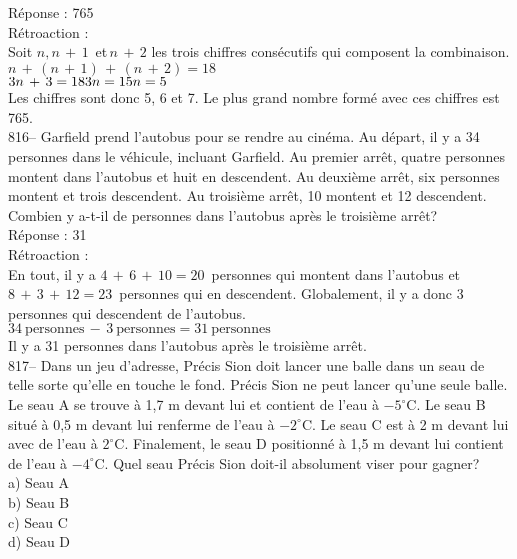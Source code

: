 ﻿\documentclass[letterpaper, 12pt]{article}
\begin{document}
R\'eponse : 765\\

R\'etroaction : \\
Soit $n, n\,+\,1\,$ et$\, n\,+\,2$ les trois chiffres cons\'ecutifs qui
composent la combinaison.  \\
$n\,+\,\left( n\,+\,1\right) \,+\,\left( n\,+\,2\right) = 18$\\
$3n\,+\,3=18\\
3n=15\\
n=5$\\
Les chiffres sont donc 5, 6 et 7.  Le plus grand nombre form\'e avec ces
chiffres est 765.\\


816-- Garfield prend l'autobus pour se rendre au cin\'ema.  Au d\'epart, il
y a 34 personnes dans le v\'ehicule, incluant Garfield.  Au premier arr\^et,
quatre personnes montent dans l'autobus et huit en descendent.  Au
deuxi\`eme arr\^et, six personnes montent et trois descendent.  Au
troisi\`eme arr\^et, 10 montent et 12 descendent.  Combien y a-t-il de
personnes dans l'autobus apr\`es le troisi\`eme arr\^et?\\

R\'eponse : 31\\

R\'etroaction : \\
En tout, il y a $4\,+\,6\,+\,10=20$~personnes qui montent dans l'autobus et
$8\,+\,3\,+\,12=23$~personnes qui en descendent.  Globalement, il y a donc 3
personnes qui descendent de l'autobus.  \\
$34~\textrm{personnes}\,-\,3~\textrm{personnes}=31~\textrm{personnes}$ \\
Il y a 31 personnes dans l'autobus apr\`es le troisi\`eme arr\^et.\\

817-- Dans un jeu d'adresse, Pr\'ecis Sion doit lancer une balle dans un
seau de telle sorte qu'elle en touche le fond.  Pr\'ecis Sion ne peut lancer
qu'une seule balle.  Le seau A se trouve \`a 1,7 m devant lui et contient de
l'eau \`a $-5^{\circ}$C.  Le seau B situ\'e \`a 0,5 m devant lui renferme de
l'eau \`a $-2^{\circ}$C.  Le seau C est \`a 2 m devant lui avec de l'eau \`a
$2^{\circ}$C.  Finalement, le seau D positionn\'e \`a 1,5 m devant lui
contient de l'eau \`a $-4^{\circ}$C.  Quel seau Pr\'ecis Sion doit-il
absolument viser pour gagner?\\
a) Seau A\\
b) Seau B\\
c) Seau C\\
d) Seau D\\
\end{document}
